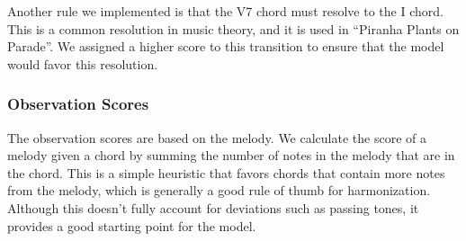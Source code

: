 Another rule we implemented is that the V7 chord must resolve to the I chord. This is a common resolution in music theory, and it is used in ``Piranha Plants on Parade''. We assigned a higher score to this transition to ensure that the model would favor this resolution.

\subsubsection{Observation Scores}

The observation scores are based on the melody. We calculate the score of a melody given a chord by summing the number of notes in the melody that are in the chord. This is a simple heuristic that favors chords that contain more notes from the melody, which is generally a good rule of thumb for harmonization. Although this doesn't fully account for deviations such as passing tones, it provides a good starting point for the model.
